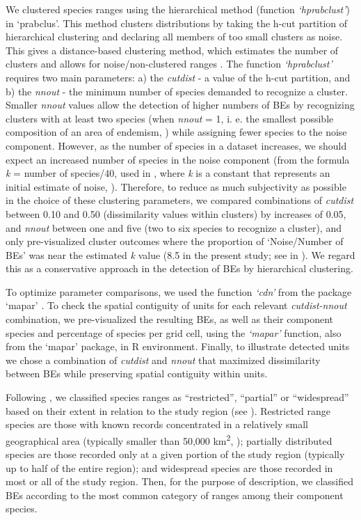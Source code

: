 \documentclass[12pt,openright,oneside,a4paper,english]{abntex2}
\begin{document}
We clustered species ranges using the hierarchical method (function \textit{‘hprabclust’}) in ‘prabclus’. This method clusters distributions by taking the h-cut partition of hierarchical clustering and declaring all members of too small clusters as noise. This gives a distance-based clustering method, which estimates the number of clusters and allows for noise/non-clustered ranges \citep{Hennig2020}. The function \textit{‘hprabclust’} requires two main parameters: a) the \textit{cutdist} - a value of the h-cut partition, and b) the \textit{nnout} - the minimum number of species demanded to recognize a cluster. Smaller \textit{nnout} values allow the detection of higher numbers of BEs by recognizing clusters with at least two species (when \textit{nnout} = 1, i. e. the smallest possible composition of an area of endemism, \citealp[][]{Hausdorf2002}) while assigning fewer species to the noise component. However, as the number of species in a dataset increases, we should expect an increased number of species in the noise component (from the formula \textit{k} = number of species/40, used in \citealp[][]{Hausdorf2003}, where \textit{k} is a constant that represents an initial estimate of noise, \citealp[see][for detailed explanations]{Byers1998}). Therefore, to reduce as much subjectivity as possible in the choice of these clustering parameters, we compared combinations of \textit{cutdist} between 0.10 and 0.50 (dissimilarity values within clusters) by increases of 0.05, and \textit{nnout} between one and five (two to six species to recognize a cluster), and only pre-visualized cluster outcomes where the proportion of ‘Noise/Number of BEs’ was near the estimated \textit{k} value (8.5 in the present study; see  in ). We regard this as a conservative approach in the detection of BEs by hierarchical clustering.

To optimize parameter comparisons, we used the function \textit{‘cdn’} from the package ‘mapar’ \citep{VieiraAlencar2022}. To check the spatial contiguity of units for each relevant \textit{cutdist-nnout} combination, we pre-visualized the resulting BEs, as well as their component species and percentage of species per grid cell, using the \textit{‘mapar’} function, also from the ‘mapar’ package, in R environment. Finally, to illustrate detected units we chose a combination of \textit{cutdist} and \textit{nnout} that maximized dissimilarity between BEs while preserving spatial contiguity within units.

Following \citet{Nogueira2019}, we classified species ranges as “restricted”, “partial” or “widespread” based on their extent in relation to the study region (see ). Restricted range species are those with known records concentrated in a relatively small geographical area (typically smaller than 50,000 km\textsuperscript{2}, \citealp[see][]{Eken2004}); partially distributed species are those recorded only at a given portion of the study region (typically up to half of the entire region); and widespread species are those recorded in most or all of the study region. Then, for the purpose of description, we classified BEs according to the most common category of ranges among their component species.
\end{document}
